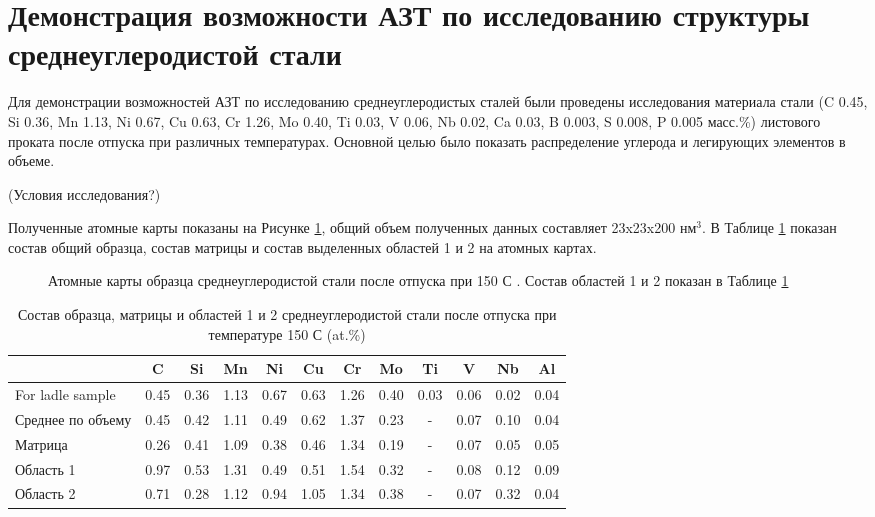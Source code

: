 \FloatBarrier

\section{Демонстрация возможности АЗТ по исследованию структуры среднеуглеродистой стали}\label{sec:ch4/sect2}

Для демонстрации возможностей АЗТ по исследованию среднеуглеродистых сталей были проведены исследования материала стали (C 0.45, Si 0.36, Mn 1.13, Ni 0.67, Cu 0.63, Cr 1.26, Mo 0.40, Ti 0.03, V 0.06, Nb 0.02, Ca 0.03, B 0.003, S 0.008, P 0.005 масс.\%) листового проката после отпуска при различных температурах. Основной целью было показать распределение углерода и легирующих элементов в объеме. 

(Условия исследования?)

Полученные атомные карты показаны на Рисунке \cref{fig:SteelAtomMaps1}, общий объем полученных данных составляет 23x23x200 нм$^{3}$. В Таблице \cref{tab:SteelComposition150} показан состав общий образца, состав матрицы и состав выделенных областей 1 и 2 на атомных картах.

\begin{figure}[ht]
	\caption{Атомные карты образца среднеуглеродистой стали после отпуска при 150 \textdegree С \cite{scbibRyabov}. Состав областей 1 и 2 показан в Таблице \cref{tab:SteelComposition150} }
	\label{fig:SteelAtomMaps1}
\end{figure} 

\begin{table} [htbp]
	\centering
	\caption{Состав образца, матрицы и областей 1 и 2 среднеуглеродистой стали после отпуска при температуре 150 \textdegree С (at.\%)}%
	\label{tab:SteelComposition150}%
	\begin{SingleSpace}
		\begin{tabular}{|p{3cm}| c | c | c | c | c | c | c | c | c | c | c |}
			\hline
			& C & Si & Mn & Ni & Cu & Cr & Mo & Ti & V & Nb & Al     \\ \hline
			For ladle sample     & 0.45 & 0.36 & 1.13 & 0.67 & 0.63 & 1.26 & 0.40 & 0.03 & 0.06 & 0.02 & 0.04   \\ \hline
			Среднее по объему   & 0.45 & 0.42 & 1.11 & 0.49 & 0.62 & 1.37 & 0.23 & - & 0.07 & 0.10 & 0.04   \\  \hline		
			Матрица   & 0.26 & 0.41 & 1.09 & 0.38 & 0.46 & 1.34 & 0.19 & - & 0.07 & 0.05 & 0.05   \\  \hline	
			Область 1   & 0.97 & 0.53 & 1.31 & 0.49 & 0.51 & 1.54 & 0.32 & - & 0.08 & 0.12 & 0.09   \\  \hline
			Область 2   & 0.71 & 0.28 & 1.12 & 0.94 & 1.05 & 1.34 & 0.38 & - & 0.07 & 0.32 & 0.04   \\  \hline	
		\end{tabular}%
	\end{SingleSpace}
\end{table}

